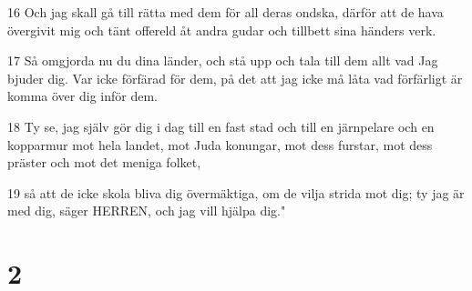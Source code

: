 \par 16 Och jag skall gå till rätta med dem för all deras ondska, därför att de hava övergivit mig och tänt offereld åt andra gudar och tillbett sina händers verk.
\par 17 Så omgjorda nu du dina länder, och stå upp och tala till dem allt vad Jag bjuder dig. Var icke förfärad för dem, på det att jag icke må låta vad förfärligt är komma över dig inför dem.
\par 18 Ty se, jag själv gör dig i dag till en fast stad och till en järnpelare och en kopparmur mot hela landet, mot Juda konungar, mot dess furstar, mot dess präster och mot det meniga folket,
\par 19 så att de icke skola bliva dig övermäktiga, om de vilja strida mot dig; ty jag är med dig, säger HERREN, och jag vill hjälpa dig."

\chapter{2}

